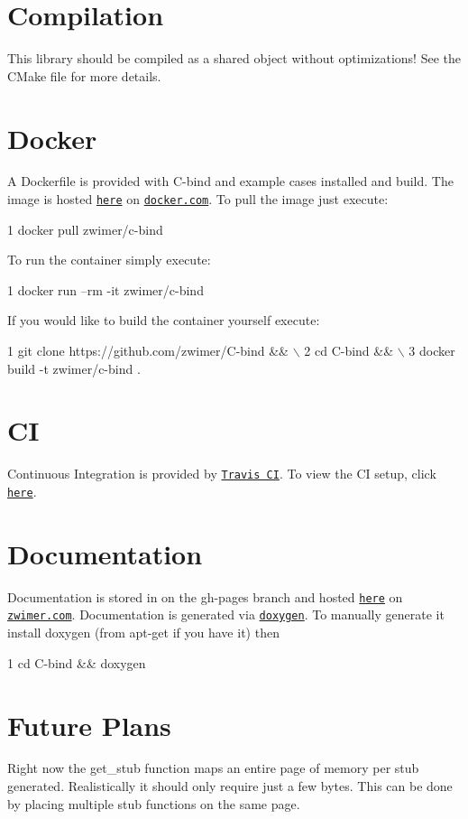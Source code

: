 \section*{Compilation}

This library should be compiled as a shared object without optimizations! See the {\ttfamily C\+Make} file for more details.

\section*{Docker}

A {\ttfamily Dockerfile} is provided with {\ttfamily C-\/bind} and example cases installed and build. The image is hosted \href{https://cloud.docker.com/repository/docker/zwimer/c-bind}{\tt here} on \href{https://docker.com}{\tt docker.\+com}. To pull the image just execute\+: 
\begin{DoxyCode}
1 docker pull zwimer/c-bind
\end{DoxyCode}
 To run the container simply execute\+: 
\begin{DoxyCode}
1 docker run --rm -it zwimer/c-bind
\end{DoxyCode}
 If you would like to build the container yourself execute\+: 
\begin{DoxyCode}
1 git clone https://github.com/zwimer/C-bind && \(\backslash\)
2 cd C-bind && \(\backslash\)
3 docker build -t zwimer/c-bind .
\end{DoxyCode}


\section*{CI}

Continuous Integration is provided by \href{https://travis-ci.org}{\tt Travis CI}. To view the CI setup, click \href{https://travis-ci.org/zwimer/C-bind/}{\tt here}.

\section*{Documentation}

Documentation is stored in on the {\ttfamily gh-\/pages} branch and hosted \href{https://zwimer.github.io/C-bind/docs/html/index.html}{\tt here} on \href{https://zwimer.com}{\tt zwimer.\+com}. Documentation is generated via \href{http://www.doxygen.nl/}{\tt doxygen}. To manually generate it install doxygen (from {\ttfamily apt-\/get} if you have it) then 
\begin{DoxyCode}
1 cd C-bind && doxygen
\end{DoxyCode}


\section*{Future Plans}


\begin{DoxyEnumerate}
\item Right now the {\ttfamily get\+\_\+stub} function maps an entire page of memory per stub generated. Realistically it should only require just a few bytes. This can be done by placing multiple stub functions on the same page. 
\end{DoxyEnumerate}